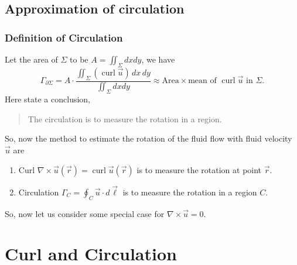 \documentclass[11pt,]{beamer}
\begin{document}
\subsection{Approximation of circulation}
\begin{frame}
\frametitle{Definition of Circulation}
	Let the area of $\Sigma$ to be $\displaystyle A = \iint_{\Sigma} dxdy$, we have 
	\begin{equation}
	\Gamma_{\partial \Sigma} = A \cdot \frac{\displaystyle\iint_{\Sigma} \left(\operatorname{curl}	\vec{u}\right)\,dx\,dy}{\displaystyle\iint_{\Sigma} dxdy}
	\approx \text{Area}\times\text{mean of $\operatorname{curl}\vec{u}$ in $\Sigma$.}
	\end{equation}
	Here state a conclusion,
	\begin{quote}
	\bigskip
	The circulation is to measure the rotation in a region.
	\end{quote}

\end{frame}
\begin{frame}
	So, now the method to estimate the rotation of the fluid flow with fluid velocity $\vec{u}$ are 
	\begin{enumerate}
	\item Curl $\nabla \times \vec{u}(\vec{r}) = \operatorname{curl}\vec{u}(\vec{r})$ is to measure the rotation at point $\vec{r}$.
	\item Circulation $\displaystyle \Gamma_{C} = \oint_{C}\vec{u}\cdot d\vec{\ell}$ is to measure the rotation in a region $C$.
	\end{enumerate}
	So, now let us consider some special case for $\nabla\times\vec{u}=0$. 
\end{frame}

\section{Curl and Circulation}
\end{document}
